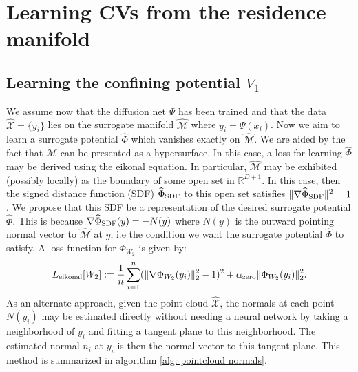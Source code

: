 \documentclass[reqno, 12pt]{article}
\begin{document}
\section{Learning CVs from the residence manifold}
\label{sec: learning cvs}
\subsection{Learning the confining potential $V_1$} 
We assume now that the diffusion net $\Psi$ has been trained and that the data $\widehat{\mathcal{X}} = \{y_i\}$ lies on the surrogate manifold $\widehat{\mathcal{M}}$ where $y_i = \Psi(x_i)$. Now we aim to learn a surrogate potential $\widehat{\Phi}$ which vanishes exactly on $\widehat{\mathcal{M}}$. We are aided by the fact that $\widehat{\mathcal{M}}$ can be presented as a hypersurface. In this case, a loss for learning $\widehat{\Phi}$ may be derived using the eikonal equation. In particular, $\widehat{\mathcal{M}}$ may be exhibited (possibly locally) as the boundary of some open set in $\mathbb{R}^{D+1}$. In this case, then the signed distance function (SDF) $\widehat{\Phi}_{\rm SDF}$ to this open set satisfies $\|\nabla \widehat{\Phi}_{\rm SDF}\|^2 =1$. We propose that this SDF be a representation of the desired surrogate potential $\widehat{\Phi}$. This is because $\nabla \widehat{\Phi}_{\rm SDF}(y) = -N(y)$ where $N(y)$ is the outward pointing normal vector to $\widehat{\mathcal{M}}$ at $y$, i.e the condition we want the surrogate potential $\widehat{\Phi}$ to satisfy. A loss function for $\Phi_{W_2}$ is given by:
\begin{align}
    L_{\rm eikonal}[W_2] :=\frac{1}{n}\sum_{i=1}^{n}(\|\nabla \Phi_{W_2}(y_i)\|_{2}^{2}-1)^2 + \alpha_{\rm zero} \|\Phi_{W_2}(y_i)\|_{2}^{2}. \label{eq: eikonal} 
\end{align}
As an alternate approach, given the point cloud $\widehat{\mathcal{X}}$, the normals at each point $N(y_i)$ may be estimated directly without needing a neural network by taking a neighborhood of $y_i$ and fitting a tangent plane to this neighborhood. The estimated normal $n_i$ at $y_i$ is then the normal vector to this tangent plane. This method is summarized in algorithm \eqref{alg: pointcloud normals}. 
\end{document}
